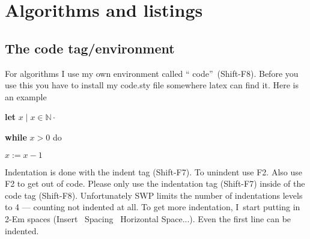                       


\chapter{Algorithms and listings}

\section{The code tag/environment}

For algorithms I use my own environment called \textquotedblleft
code\textquotedblright\ (Shift-F8). Before you use this you have to install
my code.sty file somewhere latex can find it. Here is an example

\begin{singlespaced}%

\begin{code}
\textbf{let} $x\mid x\in\mathbb{N}\cdot$

\textbf{while} $x>0$ do

\begin{indent}
\item $x:=x-1$
\end{indent}
\end{code}

\end{singlespaced}%

Indentation is done with the indent tag (Shift-F7). To unindent use F2. Also
use F2 to get out of code. Please only use the indentation tag (Shift-F7)
inside of the code tag (Shift-F8). Unfortunately SWP limits the number of
indentations levels to 4 --- counting not indented at all. To get more
indentation, I\ start putting in 2-Em spaces (Insert \TEXTsymbol{>}%
\TEXTsymbol{>}\ Spacing \TEXTsymbol{>}\TEXTsymbol{>}\ Horizontal Space...).
Even the first line can be indented.

